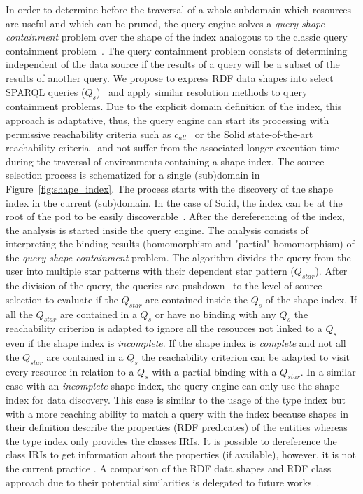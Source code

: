 In order to determine before the traversal of a whole subdomain which resources are useful and which can be pruned, the query engine solves a \emph{query-shape containment} problem over the shape of the index analogous to the classic query containment problem~\cite{afariQCE, Spasi2023, Chekol2018}.
The query containment problem consists of determining independent of the data source if the results of a query will be a subset of the results of another query.
We propose to express RDF data shapes into select SPARQL queries ($Q_{s}$)~\cite{delva2023, spapeExpressionConvert, labragayo2017validating, Corman2019} and apply similar resolution methods to query containment problems.
Due to the explicit domain definition of the index, this approach is adaptative, 
thus, the query engine can start its processing with permissive reachability criteria
such as $c_{all}$~\cite{Hartig2012} or the Solid state-of-the-art reachability criteria~\cite{Taelman2023}
and not suffer from the associated longer execution time during the traversal of environments containing a shape index.
The source selection process is schematized for a single (sub)domain in Figure~\ref{fig:shape_index}.
The process starts with the discovery of the shape index in the current (sub)domain.
In the case of Solid, the index can be at the root of the pod to be easily discoverable~.
After the dereferencing of the index, the analysis is started inside the query engine.
The analysis consists of interpreting the binding results (homomorphism and "partial" homomorphism) of the \emph{query-shape containment} problem.
The algorithm divides the query from the user into multiple star patterns with their dependent star pattern ($Q_{star}$).
After the division of the query, the queries are pushdown~\cite{Stuckenschmidt2004, Yang2021FlexPushdownDBHP} to the level of source selection to evaluate if the $Q_{star}$ are contained inside the $Q_s$ of the shape index.
If all the $Q_{star}$ are contained in a $Q_{s}$ or have no binding with any $Q_{s}$
the reachability criterion is adapted to ignore all the resources not linked to a $Q_{s}$ even if the shape index is \emph{incomplete}.
If the shape index is \emph{complete} and not all the $Q_{star}$ are contained in a $Q_{s}$ the reachability criterion can be adapted
to visit every resource in relation to a $Q_{s}$ with a partial binding with a $Q_{star}$.
In a similar case with an \emph{incomplete} shape index, the query engine can only use the shape index for data discovery.
This case is similar to the usage of the type index but with a more reaching ability to match a query with the index because shapes in their definition describe the properties (RDF predicates) of the entities whereas the type index only provides the classes IRIs.
It is possible to dereference the class IRIs to get information about the properties (if available), however, it is not the current practice \cite{Taelman2023}.
A comparison of the RDF data shapes and RDF class approach due to their potential similarities is delegated to future works~.

